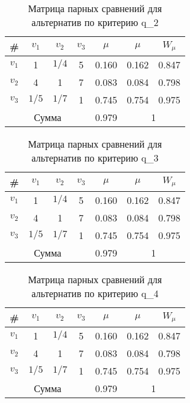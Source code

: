 \begin{table}[H]
    \centering
    \caption{Матрица парных сравнений для альтернатив по критерию q_2}\label{crit_q2}
    \begin{tabular}{|c|c|c|c|c|c|c|}
    \hline \# & $v_1$ & $v_2$ & $v_3$ & $\mu$ & $\mu$ & $W_{\mu}$ \\
    \hline $v_1$ & 1 & $1/4$ & 5 & 0.160 & 0.162 & 0.847 \\
    \hline $v_2$ & 4 & 1 & 7 &  0.083 & 0.084 & 0.798\\
    \hline $v_3$ & $1/5$ & $1/7$ & 1 & 0.745 & 0.754 & 0.975 \\
    \hline \multicolumn{4}{|c|}{Сумма} & 0.979 & \multicolumn{2}{|c|}{1} \\
    \hline
    \end{tabular}
\end{table}

\begin{table}[H]
    \centering
    \caption{Матрица парных сравнений для альтернатив по критерию q_3}\label{crit_q3}
    \begin{tabular}{|c|c|c|c|c|c|c|}
    \hline \# & $v_1$ & $v_2$ & $v_3$ & $\mu$ & $\mu$ & $W_{\mu}$ \\
    \hline $v_1$ & 1 & $1/4$ & 5 & 0.160 & 0.162 & 0.847 \\
    \hline $v_2$ & 4 & 1 & 7 &  0.083 & 0.084 & 0.798\\
    \hline $v_3$ & $1/5$ & $1/7$ & 1 & 0.745 & 0.754 & 0.975 \\
    \hline \multicolumn{4}{|c|}{Сумма} & 0.979 & \multicolumn{2}{|c|}{1} \\
    \hline
    \end{tabular}
\end{table}

\begin{table}[H]
    \centering
    \caption{Матрица парных сравнений для альтернатив по критерию q_4}\label{crit_q4}
    \begin{tabular}{|c|c|c|c|c|c|c|}
    \hline \# & $v_1$ & $v_2$ & $v_3$ & $\mu$ & $\mu$ & $W_{\mu}$ \\
    \hline $v_1$ & 1 & $1/4$ & 5 & 0.160 & 0.162 & 0.847 \\
    \hline $v_2$ & 4 & 1 & 7 &  0.083 & 0.084 & 0.798\\
    \hline $v_3$ & $1/5$ & $1/7$ & 1 & 0.745 & 0.754 & 0.975 \\
    \hline \multicolumn{4}{|c|}{Сумма} & 0.979 & \multicolumn{2}{|c|}{1} \\
    \hline
    \end{tabular}
\end{table}

